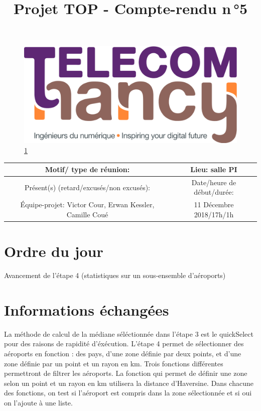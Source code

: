 \documentclass{article}
\date{}
\begin{document}
\begin{figure}
    \centering
    \includegraphics[scale=0.05]{logo_TNCY.png}
    \label{fig:logo_tncy}
    \ref{fig:logo_tncy}
\end{figure}
\title{Projet TOP - Compte-rendu n\,°5}
\maketitle
\vspace*{-1cm}

\begin{tabular}{|c|c|}
  \hline
  Motif/ type de réunion: & Lieu: salle PI \\
  \hline
   Présent(s) (retard/excusés/non excusés): &  Date/heure de début/durée:\\
  Équipe-projet: Victor Cour,
                  Erwan Kessler,
                  Camille Coué
 & 11 Décembre 2018/17h/1h \\
  \hline
\end{tabular}


\section{Ordre du jour}

Avancement de l'étape 4 (statistiques sur un sous-ensemble d'aéroports)

\section{Informations échangées}
La méthode de calcul de la médiane séléctionnée dans l'étape 3 est le quickSelect pour des raisons de rapidité d'éxécution.
\newline
L'étape 4 permet de sélectionner des aéroports en fonction : des pays, d'une zone définie par deux points, et d'une zone définie par un point et un rayon en km. Trois fonctions différentes permettront de filtrer les aéroports. La fonction qui permet de définir une zone selon un point et un rayon en km utilisera la distance d'Haversine. Dans chacune des fonctions, on test si l'aéroport est compris dans la zone sélectionnée et si oui on l'ajoute à une liste.
\end{document}
